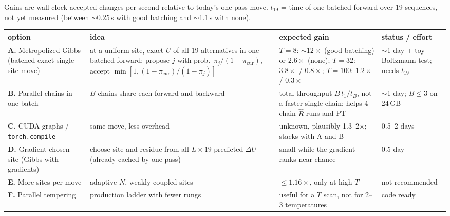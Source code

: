 \documentclass[11pt,a4paper]{article}
\begin{document}
Gains are wall-clock accepted changes per second relative to today's one-pass
move. $t_{19}$ = time of one batched forward over 19 sequences, not yet
measured (between $\sim$0.25\,s with good batching and $\sim$1.1\,s with none).

\begin{center}
\small
\begin{tabular}{R{3.1cm}R{5.2cm}R{3.6cm}R{2.6cm}}
\toprule
option & idea & expected gain & status / effort \\
\midrule
\textbf{A.} Metropolized Gibbs (batched exact single-site move)
 & at a uniform site, exact $U$ of all 19 alternatives in one batched forward;
   propose $j$ with prob.\ $\pi_j/(1-\pi_{\mathrm{cur}})$, accept
   $\min[1,(1-\pi_{\mathrm{cur}})/(1-\pi_j)]$
 & $T=8$: $\sim12\times$ (good batching) or $2.6\times$ (none);
   $T=32$: $3.8\times$ / $0.8\times$; $T=100$: $1.2\times$ / $0.3\times$
 & $\sim$1 day + toy Boltzmann test; needs $t_{19}$ \\
\addlinespace
\textbf{B.} Parallel chains in one batch
 & $B$ chains share each forward and backward
 & total throughput $B\,t_1/t_B$, not a faster single chain; helps 4-chain
   $\hat R$ runs and PT
 & $\sim$1 day; $B\le3$ on 24\,GB \\
\addlinespace
\textbf{C.} CUDA graphs / \texttt{torch.compile}
 & same move, less overhead
 & unknown, plausibly 1.3--2$\times$; stacks with A and B
 & 0.5--2 days \\
\addlinespace
\textbf{D.} Gradient-chosen site (Gibbs-with-gradients)
 & choose site and residue from all $L\times19$ predicted $\Delta U$ (already
   cached by one-pass)
 & small while the gradient ranks near chance
 & 0.5 day \\
\addlinespace
\textbf{E.} More sites per move
 & adaptive $N$, weakly coupled sites
 & $\le1.16\times$, only at high $T$
 & not recommended \\
\addlinespace
\textbf{F.} Parallel tempering
 & production ladder with fewer rungs
 & useful for a $T$ scan, not for 2--3 temperatures
 & code ready \\
\bottomrule
\end{tabular}
\end{center}
\end{document}
